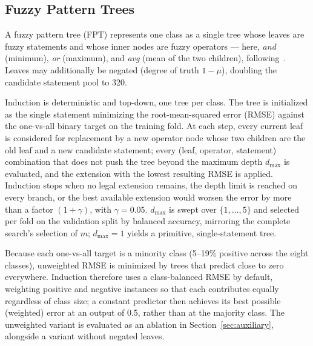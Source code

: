 \subsection{Fuzzy Pattern Trees}
A fuzzy pattern tree (FPT) represents one class as a single tree whose leaves are fuzzy statements and whose inner nodes are fuzzy operators --- here, \emph{and} (minimum), \emph{or} (maximum), and \emph{avg} (mean of the two children), following~\cite{senge2011topdown}. Leaves may additionally be negated (degree of truth $1 - \mu$), doubling the candidate statement pool to 320.

Induction is deterministic and top-down, one tree per class. The tree is initialized as the single statement minimizing the root-mean-squared error (RMSE) against the one-vs-all binary target on the training fold. At each step, every current leaf is considered for replacement by a new operator node whose two children are the old leaf and a new candidate statement; every (leaf, operator, statement) combination that does not push the tree beyond the maximum depth $d_{\max}$ is evaluated, and the extension with the lowest resulting RMSE is applied. Induction stops when no legal extension remains, the depth limit is reached on every branch, or the best available extension would worsen the error by more than a factor $(1 + \gamma)$, with $\gamma = 0.05$. $d_{\max}$ is swept over $\{1, \dots, 5\}$ and selected per fold on the validation split by balanced accuracy, mirroring the complete search's selection of $m$; $d_{\max} = 1$ yields a primitive, single-statement tree.

Because each one-vs-all target is a minority class (5--19\% positive across the eight classes), unweighted RMSE is minimized by trees that predict close to zero everywhere. Induction therefore uses a class-balanced RMSE by default, weighting positive and negative instances so that each contributes equally regardless of class size; a constant predictor then achieves its best possible (weighted) error at an output of 0.5, rather than at the majority class. The unweighted variant is evaluated as an ablation in Section~\ref{sec:auxiliary}, alongside a variant without negated leaves.
